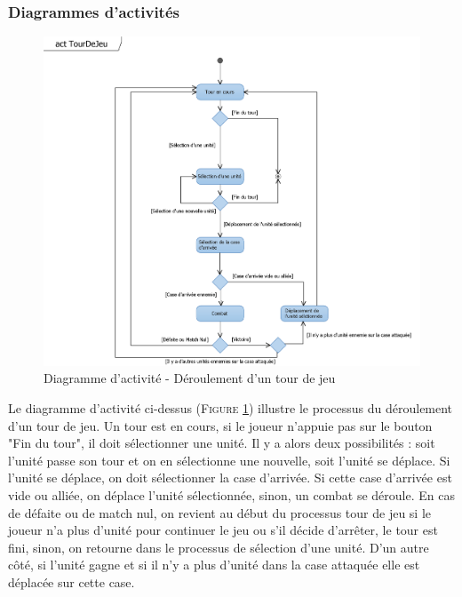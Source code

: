 \documentclass[a4paper,11pt]{article}
\begin{document}
		\subsubsection{Diagrammes d'activités}
			\begin{figure}[ht!]
				\includegraphics{actTourDeJeu.png}
				\caption{Diagramme d'activité - Déroulement d'un tour de jeu}
				\label{fig:acttour}
				\end{figure}
			\vspace*{1cm}
			Le diagramme d'activité ci-dessus (\textsc{Figure \ref{fig:acttour}}) illustre le processus du déroulement d'un tour de jeu. Un tour est en cours, si le joueur n'appuie pas sur le bouton "Fin du tour", il doit sélectionner une unité. Il y a alors deux possibilités : soit l'unité passe son tour et on en sélectionne une nouvelle, soit l'unité se déplace. Si l'unité se déplace, on doit sélectionner la case d'arrivée. Si cette case d'arrivée est vide ou alliée, on déplace l'unité sélectionnée, sinon, un combat se déroule. En cas de défaite ou de match nul, on revient au début du processus tour de jeu si le joueur n'a plus d'unité pour continuer le jeu ou s'il décide d'arrêter, le tour est fini, sinon, on retourne dans le processus de sélection d'une unité. D'un autre côté, si l'unité gagne et si il n'y a plus d'unité dans la case attaquée elle est déplacée sur cette case.
			\newpage
\end{document}

